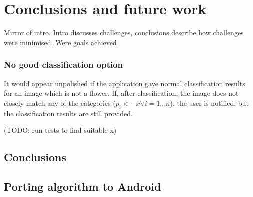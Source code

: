 \documentclass[11pt, a4paper]{report}
\begin{document}





\chapter{Conclusions and future work}
Mirror of intro. Intro discusses challenges, conclusions describe how challenges were minimised. Were goals achieved


\subsection{No good classification option}

It would appear unpolished if the application gave normal classification results for an image which is not a flower. If, after classification, the image does not closely match any of the categories ($p_{i} < -x \forall i = 1 ... n$), the user is notified, but the classification results are still provided.  

(TODO: run tests to find suitable x)

\section{Conclusions}

\section{Porting algorithm to Android}

\printbibliography
\end{document}
